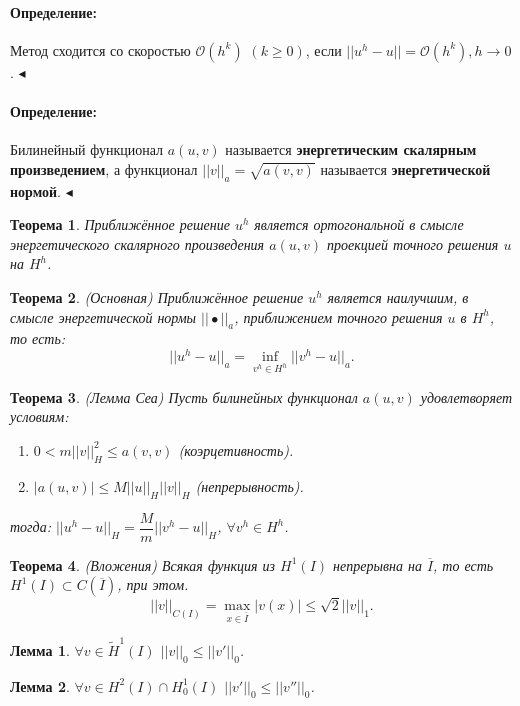 \documentclass{article}
\newtheorem{theorem}{Теорема}
\newtheorem{lemma}{Лемма}
\newenvironment{definition}{ \paragraph{Определение:}}{\hfill $\blacktriangleleft$}
\begin{document}
\begin{definition}
	Метод сходится со скоростью $\mathcal{O}(h^k)$ $(k\geqslant 0)$, если $||u^h - u|| = \mathcal{O}(h^k), h \to 0$.
\end{definition}

\begin{definition}
	Билинейный функционал $a(u,v)$ называется \textbf{энергетическим скалярным произведением}, а функционал $||v||_a = \sqrt{a(v,v)}$ называется \textbf{энергетической нормой}.
\end{definition}

\begin{theorem}
	Приближённое решение $u^h$ является ортогональной в смысле энергетического скалярного произведения $a(u,v)$ проекцией точного решения $u$ на $H^h$.
\end{theorem}

\begin{theorem}
	(Основная) Приближённое решение $u^h$ является наилучшим, в смысле энергетической нормы $||\bullet||_a$, приближением точного решения $u$ в $H^h$, то есть:
	\[
	||u^h -u||_a =\inf\limits_{v^h \in H^h} ||v^h - u||_a.
	\]
\end{theorem}

\begin{theorem}
	(Лемма Сеа)
	Пусть билинейных функционал $a(u,v)$ удовлетворяет условиям:
	\begin{enumerate}
	\item $0 < m||v||_H^2 \leqslant a(v,v)$ (коэрцетивность).
	\item $|a(u,v)| \leqslant M ||u||_H ||v||_H$ (непрерывность).
	\end{enumerate}
	тогда: $||u^h -u||_H = \dfrac{M}{m}||v^h - u||_H$, $\forall v^h \in H^h$.
\end{theorem}

\begin{theorem}
	(Вложения) Всякая функция из $H^1(I)$ непрерывна на $\overline{I}$, то есть $H^1(I) \subset C(\overline{I})$, при этом.
	\[
	||v||_{C(I)} = \max\limits_{x \in \overline{I}} |v(x)| \leqslant \sqrt{2} ||v||_1.	
	\]
\end{theorem}

\begin{lemma}
	$\forall v \in \tilde{H}^1(I)$ $||v||_0 \leqslant ||v'||_0$.
\end{lemma}

\begin{lemma}
	$\forall v \in H^2(I) \cap H_0^1(I)$ $||v'||_0 \leqslant ||v''||_0$.
\end{lemma}
\end{document}
